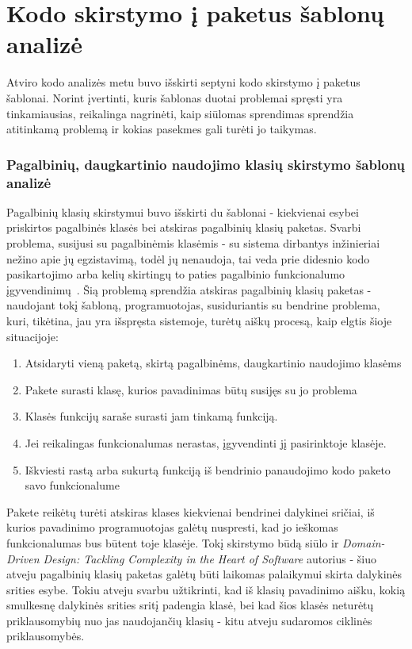\section{Kodo skirstymo į paketus šablonų analizė}
Atviro kodo analizės metu buvo išskirti septyni kodo skirstymo į paketus šablonai.
Norint įvertinti, kuris šablonas duotai problemai spręsti yra tinkamiausias, reikalinga nagrinėti, kaip siūlomas sprendimas
sprendžia atitinkamą problemą ir kokias pasekmes gali turėti jo taikymas.

\subsubsection{Pagalbinių, daugkartinio naudojimo klasių skirstymo šablonų analizė}
Pagalbinių klasių skirstymui buvo išskirti du šablonai - kiekvienai esybei priskirtos pagalbinės klasės bei atskiras pagalbinių klasių paketas.
Svarbi problema, susijusi su pagalbinėmis klasėmis - su sistema dirbantys inžinieriai nežino apie jų egzistavimą, todėl jų nenaudoja,
tai veda prie didesnio kodo pasikartojimo arba kelių skirtingų to paties pagalbinio funkcionalumo įgyvendinimų~\cite{Utility}.
Šią problemą sprendžia atskiras pagalbinių klasių paketas - naudojant tokį šabloną, programuotojas, susiduriantis su bendrine problema, kuri, tikėtina, jau yra išspręsta sistemoje, turėtų
aiškų procesą, kaip elgtis šioje situacijoje:
\begin{enumerate}
    \item Atsidaryti vieną paketą, skirtą pagalbinėms, daugkartinio naudojimo klasėms
    \item Pakete surasti klasę, kurios pavadinimas būtų susijęs su jo problema
    \item Klasės funkcijų saraše surasti jam tinkamą funkciją.
    \item Jei reikalingas funkcionalumas nerastas, įgyvendinti jį pasirinktoje klasėje.
    \item Iškviesti rastą arba sukurtą funkciją iš bendrinio panaudojimo kodo paketo savo funkcionalume
\end{enumerate}
Pakete reikėtų turėti atskiras klases kiekvienai bendrinei dalykinei sričiai, iš kurios pavadinimo programuotojas galėtų nuspresti,
kad jo ieškomas funkcionalumas bus būtent toje klasėje.
Tokį skirstymo būdą siūlo ir \textit{Domain-Driven Design: Tackling Complexity in the Heart of Software} autorius - šiuo atveju
pagalbinių klasių paketas galėtų būti laikomas palaikymui skirta dalykinės srities esybe.
Tokiu atveju svarbu užtikrinti, kad iš klasių pavadinimo aišku, kokią smulkesnę dalykinės srities sritį padengia klasė, bei kad šios klasės
neturėtų priklausomybių nuo jas naudojančių klasių - kitu atveju sudaromos ciklinės priklausomybės.

